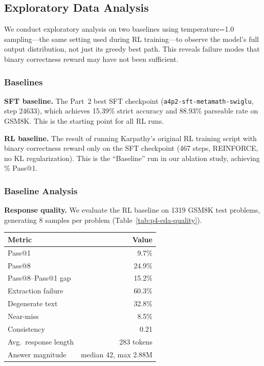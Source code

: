 \subsection{Exploratory Data Analysis}
\nestindent

We conduct exploratory analysis on two baselines using temperature=1.0 sampling---the same setting used during RL training---to observe the model's full output distribution, not just its greedy best path. This reveals failure modes that binary correctness reward may have not been sufficient.

\subsubsection{Baselines}
\nestindent

\textbf{SFT baseline.}
The Part~2 best SFT checkpoint (\texttt{a4p2-sft-metamath-swiglu}, step 24633), which achieves 15.39\% strict accuracy and 88.93\% parseable rate on GSM8K.
This is the starting point for all RL runs.

\textbf{RL baseline.}
The result of running Karpathy's original RL training script with binary correctness reward only on the SFT checkpoint (467 steps, REINFORCE, no KL regularization).
This is the ``Baseline'' run in our ablation study, achieving \pFourBaselinePassOne\% Pass@1.

\nestunindent
\subsubsection{Baseline Analysis}
\nestindent

\textbf{Response quality.}
We evaluate the RL baseline on 1319 GSM8K test problems, generating 8 samples per problem (Table~\ref{tab:p4-eda-quality}).

\vspace{1em}
\noindent\begin{minipage}{\linewidth}
\centering
\begin{tabular*}{\linewidth}{@{\extracolsep{\fill}}lr}
\toprule
\textbf{Metric} & \textbf{Value} \\
\midrule
Pass@1              & 9.7\%  \\
Pass@8              & 24.9\% \\
Pass@8--Pass@1 gap  & 15.2\% \\
Extraction failure  & 60.3\% \\
Degenerate text     & 32.8\% \\
Near-miss           & 8.5\%  \\
Consistency         & 0.21   \\
Avg.\ response length & 283 tokens \\
Answer magnitude    & median 42, max 2.88M \\
\bottomrule
\end{tabular*}
\addtocounter{table}{1}
\label{tab:p4-eda-quality}
\end{minipage}
\vspace{1em}

